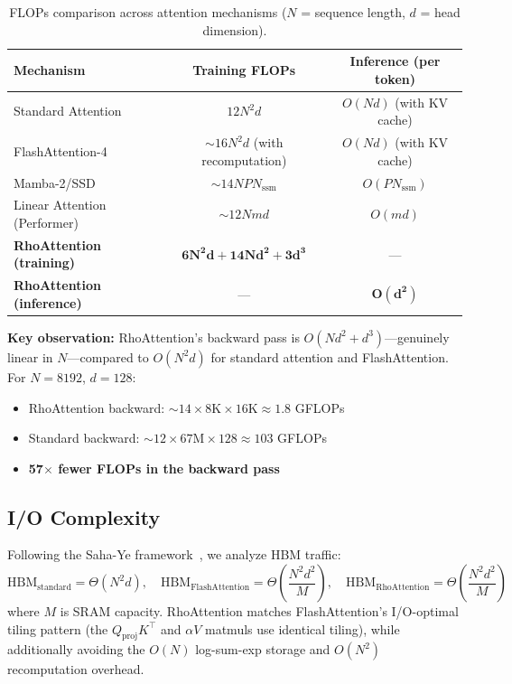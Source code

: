 \documentclass[11pt,a4paper]{article}
\theoremstyle{remark}
\begin{document}
\begin{table}[h]
\centering
\caption{FLOPs comparison across attention mechanisms ($N$ = sequence length, $d$ = head dimension).}
\begin{tabular}{lcc}
\toprule
\textbf{Mechanism} & \textbf{Training FLOPs} & \textbf{Inference (per token)} \\
\midrule
Standard Attention & $12N^2 d$ & $O(Nd)$ (with KV cache) \\
FlashAttention-4 & $\sim 16N^2 d$ (with recomputation) & $O(Nd)$ (with KV cache) \\
Mamba-2/SSD & $\sim 14 N P N_{\text{ssm}}$ & $O(P N_{\text{ssm}})$ \\
Linear Attention (Performer) & $\sim 12 N m d$ & $O(md)$ \\
\textbf{RhoAttention (training)} & $\mathbf{6N^2 d + 14Nd^2 + 3d^3}$ & --- \\
\textbf{RhoAttention (inference)} & --- & $\mathbf{O(d^2)}$ \\
\bottomrule
\end{tabular}
\end{table}

\textbf{Key observation:} RhoAttention's backward pass is $O(Nd^2 + d^3)$---genuinely linear in $N$---compared to $O(N^2 d)$ for standard attention and FlashAttention. For $N = 8192$, $d = 128$:
\begin{itemize}
    \item RhoAttention backward: $\sim 14 \times 8\text{K} \times 16\text{K} \approx 1.8$ GFLOPs
    \item Standard backward: $\sim 12 \times 67\text{M} \times 128 \approx 103$ GFLOPs
    \item \textbf{57$\times$ fewer FLOPs in the backward pass}
\end{itemize}

\subsection{I/O Complexity}

Following the Saha-Ye framework~\cite{saha2024io}, we analyze HBM traffic:
\begin{equation}
\text{HBM}_{\text{standard}} = \Theta(N^2 d), \quad \text{HBM}_{\text{FlashAttention}} = \Theta\left(\frac{N^2 d^2}{M}\right), \quad \text{HBM}_{\text{RhoAttention}} = \Theta\left(\frac{N^2 d^2}{M}\right)
\end{equation}
where $M$ is SRAM capacity. RhoAttention matches FlashAttention's I/O-optimal tiling pattern (the $Q_{\text{proj}} K^\top$ and $\alpha V$ matmuls use identical tiling), while additionally avoiding the $O(N)$ log-sum-exp storage and $O(N^2)$ recomputation overhead.
\end{document}
